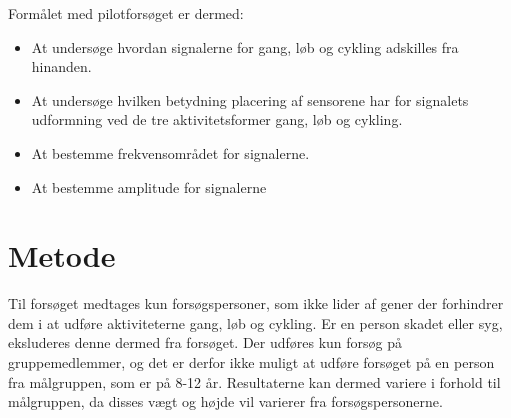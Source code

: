 Formålet med pilotforsøget er dermed:\vspace{-3mm}
\begin{itemize}
	\item At undersøge hvordan signalerne for gang, løb og cykling adskilles fra hinanden. 
	\item At undersøge hvilken betydning placering af sensorene har for signalets udformning ved de tre aktivitetsformer gang, løb og cykling. 
	\item At bestemme frekvensområdet for signalerne.
	\item At bestemme amplitude for signalerne 
\end{itemize}

\section{Metode}

Til forsøget medtages kun forsøgspersoner, som ikke lider af gener der forhindrer dem i at udføre aktiviteterne gang, løb og cykling. Er en person skadet eller syg, eksluderes denne dermed fra forsøget. Der udføres kun forsøg på gruppemedlemmer, og det er derfor ikke muligt at udføre forsøget på en person fra målgruppen, som er på 8-12 år. Resultaterne kan dermed variere i forhold til målgruppen, da disses vægt og højde vil varierer fra forsøgspersonerne. 

